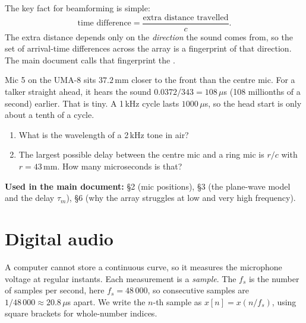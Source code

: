 \documentclass[11pt]{article}
\begin{document}
The key fact for beamforming is simple:
\begin{equation}\label{eq:delay}
  \text{time difference}=\frac{\text{extra distance travelled}}{c}.
\end{equation}
The extra distance depends only on the \emph{direction} the sound comes from, so the set of
arrival-time differences across the array is a fingerprint of that direction. The main document
calls that fingerprint the .

\begin{example}
Mic 5 on the UMA-8 sits $37.2$\,mm closer to the front than the centre mic. For a talker straight
ahead, it hears the sound $0.0372/343=108\,\mu$s (108 millionths of a second) earlier. That is
tiny. A 1\,kHz cycle lasts $1000\,\mu$s, so the head start is only about a tenth of a cycle.
\end{example}

\begin{checkyourself}
\begin{enumerate}[nosep]
\item What is the wavelength of a 2\,kHz tone in air?
\item The largest possible delay between the centre mic and a ring mic is $r/c$ with $r=43$\,mm.
  How many microseconds is that?
\end{enumerate}
\end{checkyourself}

\begin{whereused}
\textbf{Used in the main document:} \S2 (mic positions), \S3 (the plane-wave model and the delay
$\tau_m$), \S6 (why the array struggles at low and very high frequency).
\end{whereused}

\section{Digital audio}\label{sec:digital}

A computer cannot store a continuous curve, so it measures the microphone voltage at regular
instants. Each measurement is a \emph{sample}. The  $f_s$ is the
number of samples per second, here $f_s=48\,000$, so consecutive samples are
$1/48\,000\approx20.8\,\mu$s apart. We write the $n$-th sample as $x[n]=x(n/f_s)$, using square
brackets for whole-number indices.
\end{document}
